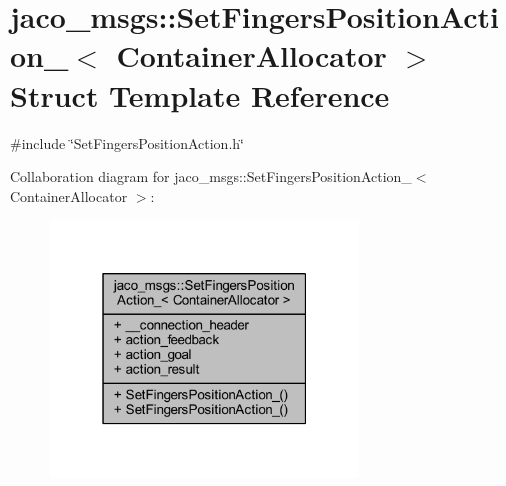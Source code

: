 \hypertarget{structjaco__msgs_1_1SetFingersPositionAction__}{}\section{jaco\+\_\+msgs\+:\+:Set\+Fingers\+Position\+Action\+\_\+$<$ Container\+Allocator $>$ Struct Template Reference}
\label{structjaco__msgs_1_1SetFingersPositionAction__}


{\ttfamily \#include \char`\"{}Set\+Fingers\+Position\+Action.\+h\char`\"{}}



Collaboration diagram for jaco\+\_\+msgs\+:\+:Set\+Fingers\+Position\+Action\+\_\+$<$ Container\+Allocator $>$\+:
\nopagebreak
\begin{figure}[H]
\begin{center}
\leavevmode
\includegraphics[width=232pt]{d0/d5a/structjaco__msgs_1_1SetFingersPositionAction____coll__graph}
\end{center}
\end{figure}
